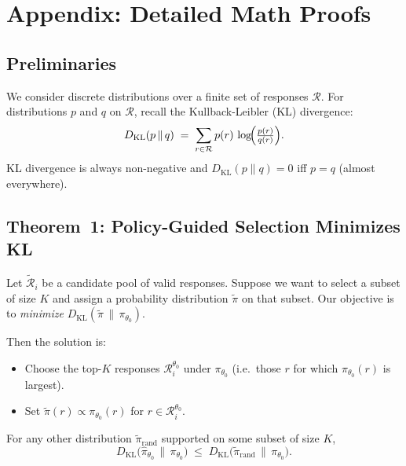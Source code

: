 \section{Appendix: Detailed Math Proofs}

\subsection{Preliminaries}

We consider discrete distributions over a finite set of responses $\mathcal{R}$. 
For distributions $p$ and $q$ on $\mathcal{R}$, recall the Kullback-Leibler (KL) divergence:
\[
D_{\mathrm{KL}}(p \,\|\, q) 
\;=\; 
\sum_{r \in \mathcal{R}} p(r)\,\log\!\Bigl(\tfrac{p(r)}{q(r)}\Bigr).
\]
KL divergence is always non-negative and $D_{\mathrm{KL}}(p\|q) = 0$ iff $p = q$ (almost everywhere).

\subsection{Theorem~1: Policy-Guided Selection Minimizes KL}

\begin{theorem}
\label{thm:kl-min-selection}
Let $\tilde{\mathcal{R}}_i$ be a candidate pool of valid responses. Suppose we want to select a subset of size $K$ and assign a probability distribution $\tilde{\pi}$ on that subset. Our objective is to \emph{minimize} $D_{\mathrm{KL}}(\tilde{\pi} \,\|\, \pi_{\theta_0})$. 

Then the solution is:
\begin{itemize}
    \item Choose the top-$K$ responses $\mathcal{R}_i^{\theta_0}$ under $\pi_{\theta_0}$ (i.e.\ those $r$ for which $\pi_{\theta_0}(r)$ is largest).
    \item Set $\tilde{\pi}(r) \propto \pi_{\theta_0}(r)$ for $r \in \mathcal{R}_i^{\theta_0}$.
\end{itemize}

For any other distribution $\tilde{\pi}_{\mathrm{rand}}$ supported on some subset of size $K$, 
\[
D_{\mathrm{KL}}\bigl(\hat{\pi}_{\theta_0}\,\big\|\,\pi_{\theta_0}\bigr) 
\;\le\; 
D_{\mathrm{KL}}\bigl(\tilde{\pi}_{\mathrm{rand}}\,\big\|\,\pi_{\theta_0}\bigr).
\]
\end{theorem}


